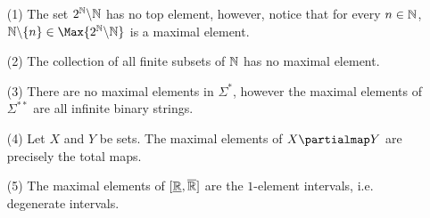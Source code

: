 \begin{example}\label{example_1.10}
  \begin{enumerate}
    \item[(1)] The set $2^{\mathbb{N}} \backslash \mathbb{N}$ has no top element, however,
      notice that for every $n \in \mathbb{N}$, $\com{\N}{\{n\}} \in
      \Max{\com{2^\N}{\N}}$ is a maximal element.

    \item[(2)] The collection of all finite subsets of $\mathbb{N}$ has no
      maximal element.

    \item[(3)] There are no maximal elements in $\Sigma^\ast$, however
      the maximal elements of  $\Sigma^{\ast\ast}$ are all infinite
      binary strings.

    \item[(4)] Let $X$ and $Y$ be sets. The maximal elements of $X
      \partialmap Y$ are precisely the total maps.

    \item[(5)] The maximal elements of $[\underline{\mathbb{R}},\overline{\mathbb{R}}]$ are the
      $1$-element intervals, i.e. degenerate intervals.
  \end{enumerate}
\end{example}
